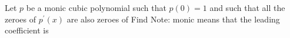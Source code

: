 Let $p$ be a monic cubic polynomial such that $p(0)=1$ and such that all the zeroes of $p^\prime (x)$ are also zeroes of   Find   Note: monic means that the leading coefficient is 